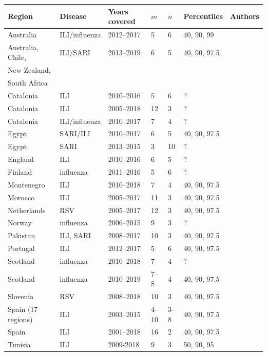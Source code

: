 \documentclass{article}
\begin{document}
\begin{table}[h!]
\begin{tabular}{l l l l l l l}
\toprule
Region & Disease & Years covered & $m$ & $n$ & Percentiles & Authors\\
\midrule
Australia & ILI/influenza & 2012--2017 & 5 & 6 & 40, 90, 99 & \cite{Vette2018}\\
Australia, Chile, & ILI/SARI & 2013--2019 & 6 & 5 & 40, 90, 97.5 & \cite{Sullivan2019}\\
New Zealand,\\
South Africa\\
Catalonia & ILI & 2010--2016 & 5 & 6 & ? & \cite{Basile2018}\\
Catalonia & ILI & 2005--2018 & 12 & 3 & ? & \cite{Basile2019}\\
Catalonia & ILI/influenza & 2010--2017 & 7 & 4 & ? & \cite{Torner2019}\\
Egypt & SARI/ILI & 2010--2017 & 6 & 5 & 40, 90, 97.5 & \cite{AbdElGawad2020}\\
Egypt & SARI & 2013--2015 & 3 & 10 & ? & \cite{Elhakim2019}\\
England & ILI & 2010--2016 & 6 & 5 & ? & \cite{Wagner2018}\\
Finland & influenza & 2011--2016 & 5 & 6 & ? & \cite{Pesaelae2019}\\
Montenegro & ILI & 2010--2018 & 7 & 4 & 40, 90, 97.5 & \cite{Rakocevic2019}\\
Morocco & ILI & 2005--2017 & 11 & 3 & 40, 90, 97.5 & \cite{Rguig2020}\\
Netherlands & RSV & 2005--2017 & 12 & 3 & 40, 90, 97.5 & \cite{Vos2019}\\
Norway & influenza & 2006--2015 & 9 & 3 & ? & \cite{Benedetti2019}\\
Pakistan & ILI, SARI & 2008--2017 & 10 & 3 & 40, 90, 97.5 & \cite{Nisar2020}\\
Portugal & ILI & 2012--2017 & 5 & 6 & 40, 90, 97.5 & \cite{Pascoa2018}\\
Scotland & influenza & 2010--2018 & 7 & 4 & ? & \cite{Murray2018}\\
Scotland & influenza & 2010--2019 & 7--8 & 4 & 40, 90, 97.5 & \cite{Dickson2020}\\
Slovenia & RSV & 2008--2018 & 10 & 3 & 40, 90, 97.5 & \cite{Grilc2021}\\
Spain (17 regions) & ILI & 2003--2015 & 4--10 & 3--8 & 40, 90, 97.5 & \cite{Bangert2017}\\
Spain & ILI & 2001--2018 & 16 & 2 & 40, 90, 97.5 & \cite{RedondoBravo2020}\\
Tunisia & ILI & 2009-2018 & 9 & 3 & 50, 90, 95 & \cite{Bouguerra2020}\\

\end{tabular}
\end{table}
\end{document}
